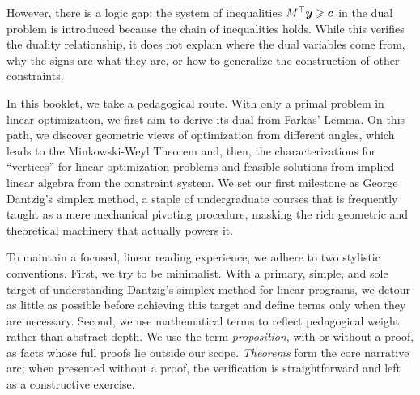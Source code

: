 \documentclass[12pt]{report}
\begin{document}
However, there is a logic gap: the system of inequalities $M^\top{\boldsymbol y} \geqslant {\boldsymbol c}$ in the dual problem is introduced because the chain of inequalities holds. While this verifies the duality relationship, it does not explain where the dual variables come from, why the signs are what they are, or how to generalize the construction of other constraints. 

In this booklet, we take a pedagogical route. With only a primal problem in linear optimization, we first aim to derive its dual from Farkas' Lemma. On this path, we discover geometric views of optimization from different angles, which leads to the Minkowski-Weyl Theorem and, then, the characterizations for ``vertices'' for linear optimization problems and feasible solutions from implied linear algebra from the constraint system. We set our first milestone as George Dantzig's simplex method, a staple of undergraduate courses that is frequently taught as a mere mechanical pivoting procedure, masking the rich geometric and theoretical machinery that actually powers it. 


To maintain a focused, linear reading experience, we adhere to two stylistic conventions. First, we try to be minimalist. With a primary, simple, and sole target of understanding Dantzig's simplex method for linear programs, we detour as little as possible before achieving this target and define terms only when they are necessary. Second, we use mathematical terms to reflect pedagogical weight rather than abstract depth. We use the term {\em proposition}, with or without a proof, as facts whose full proofs lie outside our scope. {\em Theorems} form the core narrative arc; when presented without a proof, the verification is straightforward and left as a constructive exercise.
\end{document}
